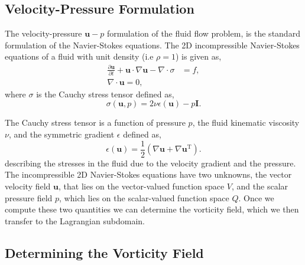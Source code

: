 \subsection{Velocity-Pressure Formulation}
The velocity-pressure $\mathbf{u}-p$ formulation of the fluid flow problem, is the standard formulation of the Navier-Stokes equations. The 2D incompressible Navier-Stokes equations of a fluid with unit density (i.e $\rho = 1$) is given as,
	\begin{subequations}
	\begin{align}
	\frac{\partial \mathbf{u}}{\partial t} + \mathbf{u}\cdot\nabla\mathbf{u} - \nabla \cdot \sigma &= f,\\
	\nabla \cdot \mathbf{u} = 0,
	\end{align}	
	\label{eq:2Dns}
	\end{subequations}
where $\sigma$ is the Cauchy stress tensor defined as,
	\begin{equation}
	\sigma(\mathbf{u},p) = 2\nu\epsilon(\mathbf{u}) - p\mathbf{I}.
	\label{eq:stressTensor}
	\end{equation}

The Cauchy stress tensor is a function of pressure $p$, the fluid kinematic viscosity $\nu$, and the symmetric gradient $\epsilon$ defined as,
	\begin{equation}
	\epsilon(\mathbf{u}) = \frac{1}{2} \left(\nabla \mathbf{u} + \nabla \mathbf{u}^{\mathrm{T}}\right).
	\label{eq:symGrad}
	\end{equation}
describing the stresses in the fluid due to the velocity gradient and the pressure. The incompressible 2D Navier-Stokes equations have two unknowns, the vector velocity field $\mathbf{u}$, that lies on the vector-valued function space $V$, and the scalar pressure field $p$, which lies on the scalar-valued function space $Q$. Once we compute these two quantities we can determine the vorticity field, which we then transfer to the Lagrangian subdomain. 

\subsection{Determining the Vorticity Field}
\label{subsec:dtvf}

